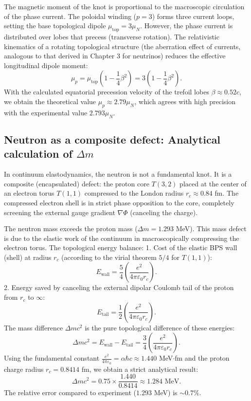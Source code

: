 \documentclass[11pt,a4paper]{article}
\begin{document}
The magnetic moment of the knot is proportional to the macroscopic circulation of the phase current. The poloidal winding ($p=3$) forms three current loops, setting the base topological dipole $\mu_{\text{top}} = 3 \mu_N$.
However, the phase current is distributed over lobes that precess (transverse rotation). The relativistic kinematics of a rotating topological structure (the aberration effect of currents, analogous to that derived in Chapter 3 for neutrinos) reduces the effective longitudinal dipole moment:
\begin{equation}
\mu_p = \mu_{\text{top}} \left(1 - \frac{1}{4}\beta^2\right) = 3 \left(1 - \frac{1}{4}\beta^2\right).
\end{equation}
With the calculated equatorial precession velocity of the trefoil lobes $\beta \approx 0.52 c$, we obtain the theoretical value $\mu_p \approx 2.79 \mu_N$, which agrees with high precision with the experimental value $2.793 \mu_N$.

\subsection{Neutron as a composite defect: Analytical calculation of $\Delta m$}
In continuum elastodynamics, the neutron is not a fundamental knot. It is a composite (encapsulated) defect: the proton core $T(3,2)$ placed at the center of an electron torus $T(1,1)$ compressed to the London radius $r_c \approx 0.84$ fm. The compressed electron shell is in strict phase opposition to the core, completely screening the external gauge gradient $\nabla \Phi$ (canceling the charge).

The neutron mass exceeds the proton mass ($\Delta m = 1.293$ MeV). This mass defect is due to the elastic work of the continuum in macroscopically compressing the electron torus. The topological energy balance:
1. Cost of the elastic BPS wall (shell) at radius $r_c$ (according to the virial theorem $5/4$ for $T(1,1)$):
\begin{equation}
E_{\text{wall}} = \frac{5}{4} \left( \frac{e^2}{4\pi\varepsilon_0 r_c} \right).
\end{equation}
2. Energy saved by canceling the external dipolar Coulomb tail of the proton from $r_c$ to $\infty$:
\begin{equation}
E_{\text{tail}} = \frac{1}{2} \left( \frac{e^2}{4\pi\varepsilon_0 r_c} \right).
\end{equation}
The mass difference $\Delta m c^2$ is the pure topological difference of these energies:
\begin{equation}
\Delta m c^2 = E_{\text{wall}} - E_{\text{tail}} = \frac{3}{4} \left( \frac{e^2}{4\pi\varepsilon_0 r_c} \right).
\end{equation}
Using the fundamental constant $\frac{e^2}{4\pi\varepsilon_0} = \alpha \hbar c \approx 1.440$ MeV$\cdot$fm and the proton charge radius $r_c = 0.8414$ fm, we obtain a strict analytical result:
\begin{equation}
\Delta m c^2 = 0.75 \times \frac{1.440}{0.8414} \approx 1.284 \text{ MeV}.
\end{equation}
The relative error compared to experiment ($1.293$ MeV) is $\sim 0.7\%$.
\end{document}
